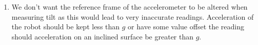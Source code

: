 \documentclass[11pt]{article}
\begin{document}
\begin{enumerate}
\begin{enumerate}
        \item %
        We don't want the reference frame of the accelerometer to be altered when measuring tilt as this would lead to very inaccurate readings. Acceleration of the robot should be kept less than $g$ or have some value offset the reading should acceleration on an inclined surface be greater than $g$.
    \end{enumerate}
\end{enumerate}
\end{document}
